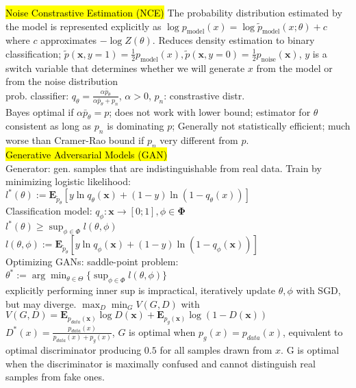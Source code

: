\documentclass[11pt,landscape]{article}
\begin{document}
\begin{multicols*}{3}
\hl{Noise Constrastive Estimation (NCE)}
The probability distribution estimated by the model is represented explicitly as 
$\log p_\text{model}(x)=\log \tilde{p}_\text{model}(x;\theta) +c$ where $c$ approximates $-\log Z(\theta)$. Reduces density estimation to binary classification;
$\tilde{p}(\mathbf{x},y=1)=\frac{1}{2}p_\text{model}(x), \tilde{p}(\mathbf{x},y=0)=\frac{1}{2}p_\text{noise}(\mathbf{x})$,
$y$ is a switch variable that determines whether we will generate $x$ from the model or from the noise distribution\\
prob. classifier: $q_\theta = \frac{\alpha \bar{p}_\theta}{\alpha \bar{p}_\theta + p_n}$, $\alpha>0$, $p_n$: constrastive distr.\\
Bayes optimal if $\alpha \bar{p}_\theta = p$; does not work with lower bound; estimator for $\theta$ consistent as long as $p_n$ is dominating $p$; Generally not statistically efficient; much worse than Cramer-Rao bound if $p_n$ very different from $p$.\\
\hl{Generative Adversarial Models (GAN)}\\
Generator: gen. samples that are indistinguishable from real data. Train by minimizing logistic likelihood: \\
$l^*(\theta):=\mathbf{E}_{\tilde{p}_\theta}[y\ln q_\theta(\mathbf{x})+(1-y)\ln(1-q_\theta(x))]$ \\
Classification model: $q_\phi : \mathbf{x}\rightarrow [0;1], \phi \in \mathbf{\Phi}$ \\
$l^*(\theta) \geq \sup_{\phi\in\Phi}l(\theta,\phi)$ \\
$l(\theta,\phi):=\mathbf{E}_{\tilde{p}_\theta}[y \ln q_\phi(\mathbf{x})+(1-y)\ln(1-q_\phi(\mathbf{x}))]$\\ 
Optimizing GANs: saddle-point problem:\\
$\theta^* :=\arg\min_{\theta\in\Theta}
\{\sup_{\phi\in\Phi}l(\theta,\phi)\}$ \\
explicitly performing inner sup is impractical, iteratively update $\theta, \phi$ with SGD, but may diverge.
$\max_D\min_G V(G,D)$ with $V(G,D)=\mathbf{E}_{p_{data}(\mathbf{x})}\log D(\mathbf{x}) + \mathbf{E}_{p_g(\mathbf{x})}\log(1-D(\mathbf{x}))$\\
$D^*(x)=\frac{p_{data}(x)}{p_{data}(x) + p_{g}(x)}$, 
$G$ is optimal when $p_g(x)=p_{data}(x)$, equivalent to optimal discriminator producing $0.5$ for all samples drawn from $x$. G is optimal when the discriminator is maximally confused and cannot distinguish real samples from fake ones.

\end{multicols*}
\end{document}
